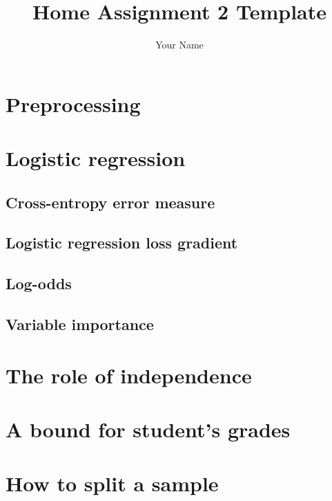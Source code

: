 \documentclass[a4paper,12pt]{article}
\begin{document}
\title{\large Home Assignment 2 Template}
\author{Your Name}
\maketitle
\tableofcontents
\newpage

\section{Preprocessing}

\section{Logistic regression}
\subsection{Cross-entropy error measure}
\subsection{Logistic regression loss gradient}
\subsection{Log-odds}
\subsection{Variable importance}
\section{The role of independence}

\section{A bound for student’s grades}

\section{How to split a sample}
\end{document}
